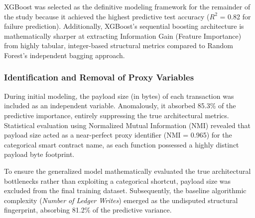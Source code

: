 \documentclass[manuscript,screen]{acmart}
\begin{document}
	\begin{table}[h]
    \centering
    \caption{Comparative Performance of Machine Learning Models (Failure Rate Prediction)}
    \label{tab:ml_performance}
    \end{table}

	XGBoost was selected as the definitive modeling framework for the remainder of the study because it achieved the highest predictive test accuracy ($R^2$ = 0.82 for failure prediction). Additionally, XGBoost's sequential boosting architecture is mathematically sharper at extracting Information Gain (Feature Importance) from highly tabular, integer-based structural metrics compared to Random Forest's independent bagging approach.

	\subsubsection{Identification and Removal of Proxy Variables}
	During initial modeling, the payload size (in bytes) of each transaction was included as an independent variable. Anomalously, it absorbed 85.3\% of the predictive importance, entirely suppressing the true architectural metrics. Statistical evaluation using Normalized Mutual Information (NMI) revealed that payload size acted as a near-perfect proxy identifier (NMI = 0.965) for the categorical smart contract name, as each function possessed a highly distinct payload byte footprint. 
	
	To ensure the generalized model mathematically evaluated the true architectural bottlenecks rather than exploiting a categorical shortcut, payload size was excluded from the final training dataset. Subsequently, the baseline algorithmic complexity (\textit{Number of Ledger Writes}) emerged as the undisputed structural fingerprint, absorbing 81.2\% of the predictive variance.
\end{document}

